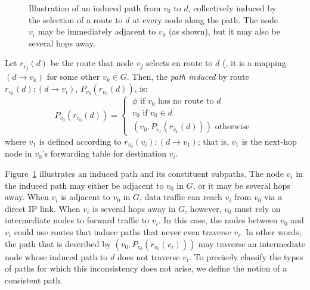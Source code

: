 \begin{figure}
\centering
\begin{psfrags}
\end{psfrags}
\caption[Illustration of an induced path.]{Illustration of an induced 
  path from $v_0$ to $d$, collectively induced by the selection of
  a route to $d$ at every node along the path.  The node $v_i$ may be
  immediately adjacent to $v_0$ (as shown), but it may also be several
  hops away.}
\label{fig:induced_path}
\end{figure}


\begin{defn}\label{defn:ipath}
Let $r_{v_j}(d)$ be the route that node $v_j$ selects en route to $d$
(\ie, it is a mapping $(d \rightarrow v_k)$ for some other $v_k\in G$.
Then, the {\em path induced} by route $r_{v_0}(d): (d \rightarrow v_i)$,
$P_{v_0}(r_{v_0}(d))$, is:
\[
P_{v_0}(r_{v_0}(d)) = \left\{\
\begin{array}{l}
\phi \textrm{ if $v_0$ has no route to $d$ }\\
v_0  \textrm{ if $v_0 \in d$}\\
(v_0, P_{v_1}(r_{v_1}(d))) \textrm{ otherwise }
\end{array}
\right.
\]
where $v_1$ is defined according to $r_{v_0}(v_i): (d \rightarrow v_1)$;
that is, $v_1$ is the next-hop node in $v_0$'s forwarding table for
destination $v_i$.
\end{defn}

\noindent
Figure~\ref{fig:induced_path} illustrates an induced path and its
constituent subpaths.  The node $v_i$ in the induced path may either be
adjacent to $v_0$ in $G$, or it may be several hops away.  When $v_i$ is
adjacent to $v_0$ in $G$, data traffic can reach $v_i$ from $v_0$ via a direct
IP link.  When $v_i$ is several hops away in $G$, however, $v_0$ must
rely on intermediate nodes to forward traffic to $v_i$.  In this case,
the nodes between $v_0$ and $v_i$ could 
use routes that induce paths that never even traverse $v_i$.
In other words, the path that is described by $(v_0,
P_{v_0}(r_{v_0}(v_i)))$ may traverse an intermediate node whose induced
path to $d$ does not traverse $v_i$.  To precisely
classify the types of paths for which 
this inconsistency does not arise, we define the notion of a consistent
path.

